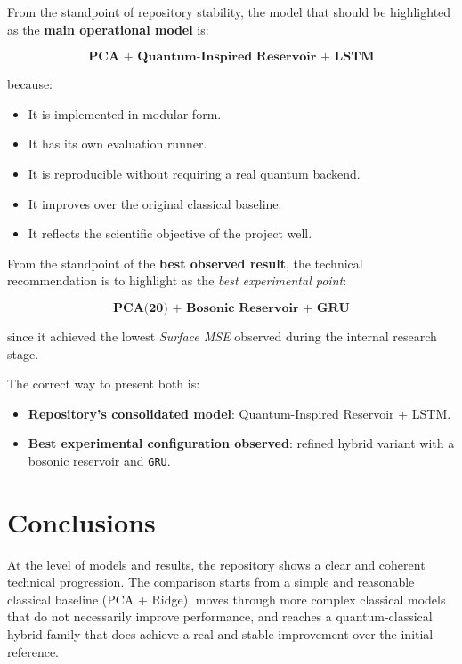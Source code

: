 \documentclass[11pt,a4paper]{article}
\begin{document}
From the standpoint of repository stability, the model that should be highlighted as the \textbf{main operational model} is:

\[
\textbf{PCA + Quantum-Inspired Reservoir + LSTM}
\]

because:

\begin{itemize}
    \item It is implemented in modular form.
    \item It has its own evaluation runner.
    \item It is reproducible without requiring a real quantum backend.
    \item It improves over the original classical baseline.
    \item It reflects the scientific objective of the project well.
\end{itemize}

From the standpoint of the \textbf{best observed result}, the technical recommendation is to highlight as the \textit{best experimental point}:

\[
\textbf{PCA(20) + Bosonic Reservoir + GRU}
\]

since it achieved the lowest \textit{Surface MSE} observed during the internal research stage.

The correct way to present both is:

\begin{itemize}
    \item \textbf{Repository’s consolidated model}: Quantum-Inspired Reservoir + LSTM.
    \item \textbf{Best experimental configuration observed}: refined hybrid variant with a bosonic reservoir and \texttt{GRU}.
\end{itemize}

\section{Conclusions}

At the level of models and results, the repository shows a clear and coherent technical progression. The comparison starts from a simple and reasonable classical baseline (PCA + Ridge), moves through more complex classical models that do not necessarily improve performance, and reaches a quantum-classical hybrid family that does achieve a real and stable improvement over the initial reference.
\end{document}
